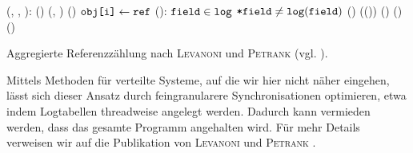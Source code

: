 \begin{algorithm}[h!]
\begin{algorithmic}[1]
	\State \Atomic {}(, , ):
	\State \quad \IF \NOT {}()
	\State \quad \quad {}(, )	
	\State \quad \quad {}()		
	\State \quad $\texttt{obj[i]} \gets \texttt{ref}$
	\Statex
	\State \Atomic {}():
	\State \quad \FOREACH $\texttt{field} \in \texttt{log}$
	\State \quad \quad \IF $\texttt{*field} \neq \texttt{log}(\texttt{field})$	
	\State \quad \quad \quad {}()	
	\State \quad \quad \quad {}(())	
	\State \quad \quad {}()	
	\State \quad \quad {}()		
	\State \quad {}()		
\end{algorithmic}
\caption[Aggregierte Referenzzählung nach \textsc{Levanoni} und \textsc{Petrank}]{Aggregierte Referenzzählung nach \textsc{Levanoni} und \textsc{Petrank} (vgl. \cite[S. 14ff]{levanoni2006}).}
\label{algo:coalesced-rc}
\end{algorithm}

Mittels Methoden für verteilte Systeme, auf die wir hier nicht näher eingehen, lässt sich dieser Ansatz durch feingranularere Synchronisationen optimieren, etwa indem Logtabellen threadweise angelegt werden.
Dadurch kann vermieden werden, dass das gesamte Programm angehalten wird.
Für mehr Details verweisen wir auf die Publikation von \textsc{Levanoni} und \textsc{Petrank} \cite[S. 19]{levanoni2006}.